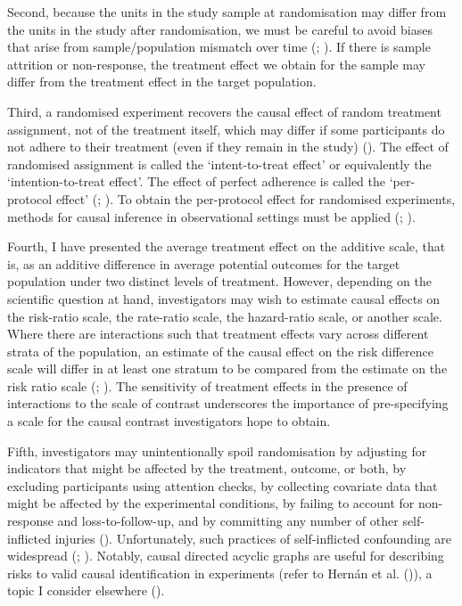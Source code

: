 \documentclass[
  single column]{article}
\begin{document}
Second, because the units in the study sample at randomisation may
differ from the units in the study after randomisation, we must be
careful to avoid biases that arise from sample/population mismatch over
time (;
). If there is
sample attrition or non-response, the treatment effect we obtain for the
sample may differ from the treatment effect in the target population.

Third, a randomised experiment recovers the causal effect of random
treatment assignment, not of the treatment itself, which may differ if
some participants do not adhere to their treatment (even if they remain
in the study) (). The
effect of randomised assignment is called the `intent-to-treat effect'
or equivalently the `intention-to-treat effect'. The effect of perfect
adherence is called the `per-protocol effect'
(;
). To obtain the per-protocol
effect for randomised experiments, methods for causal inference in
observational settings must be applied
(;
).

Fourth, I have presented the average treatment effect on the additive
scale, that is, as an additive difference in average potential outcomes
for the target population under two distinct levels of treatment.
However, depending on the scientific question at hand, investigators may
wish to estimate causal effects on the risk-ratio scale, the rate-ratio
scale, the hazard-ratio scale, or another scale. Where there are
interactions such that treatment effects vary across different strata of
the population, an estimate of the causal effect on the risk difference
scale will differ in at least one stratum to be compared from the
estimate on the risk ratio scale
(;
). The sensitivity of
treatment effects in the presence of interactions to the scale of
contrast underscores the importance of pre-specifying a scale for the
causal contrast investigators hope to obtain.

Fifth, investigators may unintentionally spoil randomisation by
adjusting for indicators that might be affected by the treatment,
outcome, or both, by excluding participants using attention checks, by
collecting covariate data that might be affected by the experimental
conditions, by failing to account for non-response and
loss-to-follow-up, and by committing any number of other self-inflicted
injuries ().
Unfortunately, such practices of self-inflicted confounding are
widespread (;
). Notably, causal
directed acyclic graphs are useful for describing risks to valid causal
identification in experiments (refer to Hernán et al.
()), a topic I consider elsewhere
().
\end{document}
